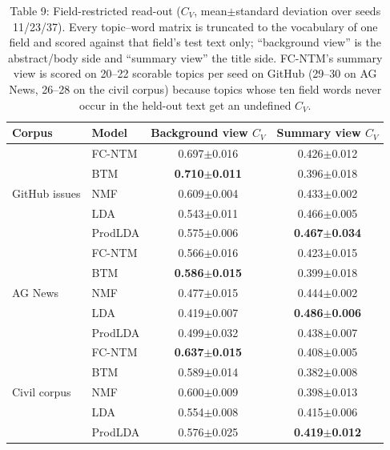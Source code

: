 \documentclass{article}
\begin{document}
\begin{table}[t]
\centering
\caption{Table 9: Field-restricted read-out ($C_V$, mean$\pm$standard deviation over seeds 11/23/37). Every topic--word matrix is truncated to the vocabulary of one field and scored against that field's test text only; ``background view'' is the abstract/body side and ``summary view'' the title side. FC-NTM's summary view is scored on 20--22 scorable topics per seed on GitHub (29--30 on AG News, 26--28 on the civil corpus) because topics whose ten field words never occur in the held-out text get an undefined $C_V$.}
\label{tab:fieldview-baselines}
\small
\setlength{\tabcolsep}{4pt}
\begin{tabular}{@{}llcc@{}}
\toprule
Corpus & Model & Background view $C_V$ & Summary view $C_V$ \\
\midrule
\multirow{5}{*}{GitHub issues}
 & FC-NTM & 0.697$\pm$0.016 & 0.426$\pm$0.012 \\
 & BTM & \textbf{0.710$\pm$0.011} & 0.396$\pm$0.018 \\
 & NMF & 0.609$\pm$0.004 & 0.433$\pm$0.002 \\
 & LDA & 0.543$\pm$0.011 & 0.466$\pm$0.005 \\
 & ProdLDA & 0.575$\pm$0.006 & \textbf{0.467$\pm$0.034} \\
\midrule
\multirow{5}{*}{AG News}
 & FC-NTM & 0.566$\pm$0.016 & 0.423$\pm$0.015 \\
 & BTM & \textbf{0.586$\pm$0.015} & 0.399$\pm$0.018 \\
 & NMF & 0.477$\pm$0.015 & 0.444$\pm$0.002 \\
 & LDA & 0.419$\pm$0.007 & \textbf{0.486$\pm$0.006} \\
 & ProdLDA & 0.499$\pm$0.032 & 0.438$\pm$0.007 \\
\midrule
\multirow{5}{*}{Civil corpus}
 & FC-NTM & \textbf{0.637$\pm$0.015} & 0.408$\pm$0.005 \\
 & BTM & 0.589$\pm$0.014 & 0.382$\pm$0.008 \\
 & NMF & 0.600$\pm$0.009 & 0.398$\pm$0.013 \\
 & LDA & 0.554$\pm$0.008 & 0.415$\pm$0.006 \\
 & ProdLDA & 0.576$\pm$0.025 & \textbf{0.419$\pm$0.012} \\
\bottomrule
\end{tabular}
\end{table}
\end{document}

